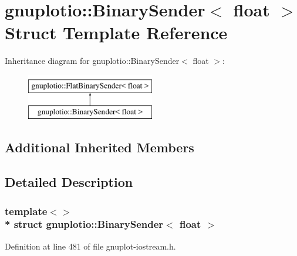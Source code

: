 \hypertarget{structgnuplotio_1_1_binary_sender_3_01float_01_4}{}\section{gnuplotio\+:\+:Binary\+Sender$<$ float $>$ Struct Template Reference}
\label{structgnuplotio_1_1_binary_sender_3_01float_01_4}
Inheritance diagram for gnuplotio\+:\+:Binary\+Sender$<$ float $>$\+:\begin{figure}[H]
\begin{center}
\leavevmode
\includegraphics[height=2.000000cm]{structgnuplotio_1_1_binary_sender_3_01float_01_4}
\end{center}
\end{figure}
\subsection*{Additional Inherited Members}


\subsection{Detailed Description}
\subsubsection*{template$<$$>$\\*
struct gnuplotio\+::\+Binary\+Sender$<$ float $>$}



Definition at line 481 of file gnuplot-\/iostream.\+h.

